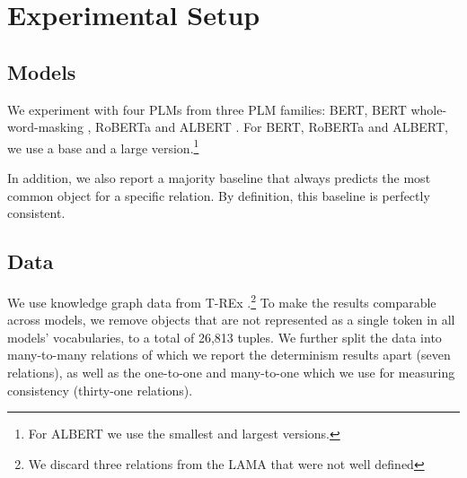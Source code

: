 \section{Experimental Setup}
\label{sec:setup}

\subsection{Models}
We experiment with four PLMs
from three PLM families: BERT, BERT whole-word-masking
\cite{bert}, RoBERTa \cite{roberta} and ALBERT
\cite{albert}. For BERT, RoBERTa and ALBERT, we use a base and a large version.\footnote{For ALBERT we use the smallest and largest versions.}


In addition, we also report a majority baseline that always predicts the most common object for a specific relation. By definition, this baseline is perfectly consistent.

\subsection{Data}
\label{setupdata}


We use knowledge graph data from T-REx \cite{trex}.\footnote{We discard three relations from the LAMA that were not well defined} To make the results comparable across models, we remove objects that are not represented as a single token in all models'
vocabularies, to a total of 26,813 tuples.
We further split the data into many-to-many relations of which we report the determinism results apart (seven relations), as well as the one-to-one and many-to-one which we use for measuring consistency (thirty-one relations). 

